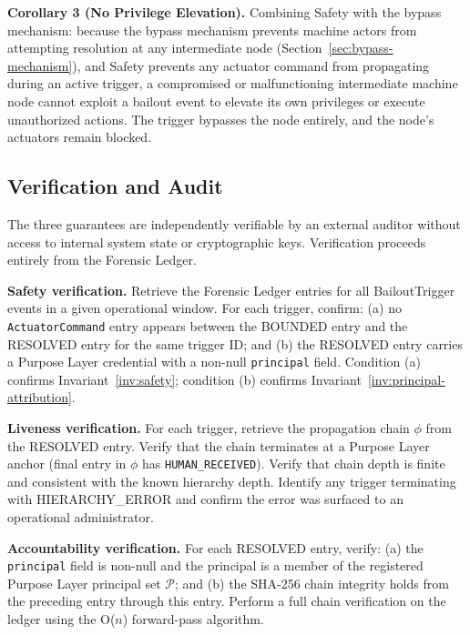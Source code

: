 \noindent\textbf{Corollary 3 (No Privilege Elevation).} Combining Safety with the bypass mechanism: because the bypass mechanism prevents machine actors from attempting resolution at any intermediate node (Section~\ref{sec:bypass-mechanism}), and Safety prevents any actuator command from propagating during an active trigger, a compromised or malfunctioning intermediate machine node cannot exploit a bailout event to elevate its own privileges or execute unauthorized actions. The trigger bypasses the node entirely, and the node's actuators remain blocked.

\subsection{Verification and Audit}
\label{sec:guarantee-verification}

The three guarantees are independently verifiable by an external auditor without access to internal system state or cryptographic keys. Verification proceeds entirely from the Forensic Ledger.

\medskip

\noindent\textbf{Safety verification.} Retrieve the Forensic Ledger entries for all BailoutTrigger events in a given operational window. For each trigger, confirm: (a) no \texttt{ActuatorCommand} entry appears between the BOUNDED entry and the RESOLVED entry for the same trigger ID; and (b) the RESOLVED entry carries a Purpose Layer credential with a non-null \texttt{principal} field. Condition (a) confirms Invariant~\ref{inv:safety}; condition (b) confirms Invariant~\ref{inv:principal-attribution}.

\medskip

\noindent\textbf{Liveness verification.} For each trigger, retrieve the propagation chain $\phi$ from the RESOLVED entry. Verify that the chain terminates at a Purpose Layer anchor (final entry in $\phi$ has \texttt{HUMAN\_RECEIVED}). Verify that chain depth is finite and consistent with the known hierarchy depth. Identify any trigger terminating with HIERARCHY\_ERROR and confirm the error was surfaced to an operational administrator.

\medskip

\noindent\textbf{Accountability verification.} For each RESOLVED entry, verify: (a) the \texttt{principal} field is non-null and the principal is a member of the registered Purpose Layer principal set $\mathcal{P}$; and (b) the SHA-256 chain integrity holds from the preceding entry through this entry. Perform a full chain verification on the ledger using the O($n$) forward-pass algorithm.

